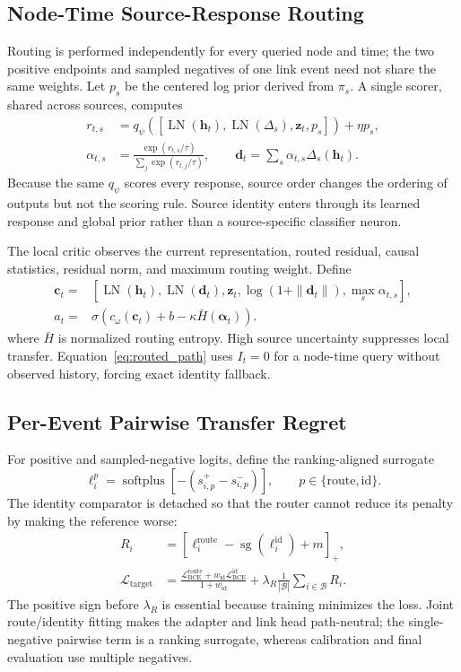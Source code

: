 \documentclass[journal]{IEEEtran}
\begin{document}
\subsection{Node-Time Source-Response Routing}
Routing is performed independently for every queried node and time; the two positive endpoints and sampled negatives of one link event need not share the same weights. Let $p_s$ be the centered log prior derived from $\pi_s$. A single scorer, shared across sources, computes
\begin{align}
r_{t,s}&=q_\psi([\operatorname{LN}(\mathbf h_t),
\operatorname{LN}(\Delta_s),\mathbf z_t,p_s])+\eta p_s,\\
\alpha_{t,s}&=\frac{\exp(r_{t,s}/\tau)}
{\sum_j\exp(r_{t,j}/\tau)},\qquad
\mathbf d_t=\sum_s\alpha_{t,s}\Delta_s(\mathbf h_t).
\end{align}
Because the same $q_\psi$ scores every response, source order changes the ordering of outputs but not the scoring rule. Source identity enters through its learned response and global prior rather than a source-specific classifier neuron.

The local critic observes the current representation, routed residual, causal statistics, residual norm, and maximum routing weight. Define
\begin{align}
\mathbf c_t={}&[\operatorname{LN}(\mathbf h_t),\operatorname{LN}(\mathbf d_t),
\mathbf z_t,\log(1+\|\mathbf d_t\|),\max_s\alpha_{t,s}],\\
a_t={}&\sigma\!\left(c_\omega(\mathbf c_t)+b-
\kappa\bar H(\boldsymbol\alpha_t)\right).
\label{eq:local_accept}
\end{align}
where $\bar H$ is normalized routing entropy. High source uncertainty suppresses local transfer. Equation~\eqref{eq:routed_path} uses $I_t=0$ for a node-time query without observed history, forcing exact identity fallback.

\subsection{Per-Event Pairwise Transfer Regret}
For positive and sampled-negative logits, define the ranking-aligned surrogate
\begin{equation}
\ell_i^p=\operatorname{softplus}[-(s_{i,p}^{+}-s_{i,p}^{-})],
\qquad p\in\{\mathrm{route},\mathrm{id}\}.
\end{equation}
The identity comparator is detached so that the router cannot reduce its penalty by making the reference worse:
\begin{align}
R_i&=[\ell_i^{\mathrm{route}}-\operatorname{sg}(\ell_i^{\mathrm{id}})+m]_+,\\
\mathcal L_{\mathrm{target}}
&=\frac{\mathcal L_{\mathrm{BCE}}^{\mathrm{route}}
+w_{\mathrm{id}}\mathcal L_{\mathrm{BCE}}^{\mathrm{id}}}
{1+w_{\mathrm{id}}}
+\lambda_R\frac1{|\mathcal B|}\sum_{i\in\mathcal B}R_i.
\label{eq:event_regret}
\end{align}
The positive sign before $\lambda_R$ is essential because training minimizes the loss. Joint route/identity fitting makes the adapter and link head path-neutral; the single-negative pairwise term is a ranking surrogate, whereas calibration and final evaluation use multiple negatives.
\end{document}
